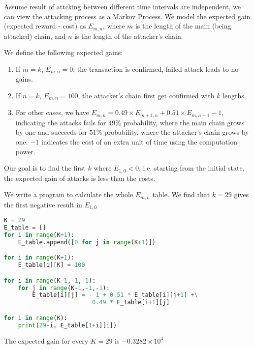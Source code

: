 \documentclass{oxmathproblems}
\begin{document}
\vspace{-15mm}

Assume result of attcking between different time intervals are independent, we can view the attacking process as a Markov Process. We model the expected gain (expected reward - cost) as $E_{m,n}$, where $m$ is the length of the main (being attacked) chain, and $n$ is the length of the attacker's chain.

We define the following expected gains:
\begin{enumerate}
    \item If $m=k$, $E_{m,n}=0$, the transaction is confirmed, failed attack leads to no gains.
    \item If $n=k$, $E_{m,n}=100$, the attacker's chain first get confirmed with $k$ lengths.
    \item For other cases, we have $E_{m,n} = 0.49 \times E_{m+1,n} + 0.51 \times E_{m,n+1} - 1$, indicating the attacks fails for 49\% probability, where the main chain grows by one and succeeds for 51\% probability, where the attacker's chain grows by one. $-1$ indicates the cost of an extra unit of time using the computation power.
\end{enumerate}


Our goal is to find the first $k$ where $E_{1,0} < 0$, i.e. starting from the initial state, the expected gain of attacks is less than the costs.

We write a program to calculate the whole $E_{m,n}$ table. We find that $k=29$ gives the first negative result in $E_{1,0}$

\begin{lstlisting}[language=Python]
K = 29
E_table = []
for i in range(K+1):
    E_table.append([0 for j in range(K+1)])

for i in range(K+1):
    E_table[i][K] = 100

for i in range(K-1,-1,-1):
    for j in range(K-1,-1,-1):
        E_table[i][j] = - 1 + 0.51 * E_table[i][j+1] +\
                         0.49 * E_table[i+1][j]

for i in range(K):
    print(29-i, E_table[1+i][i])
\end{lstlisting}

The expected gain for every $K= 29$ is $-0.3282 \times 10^4$
\end{document}
